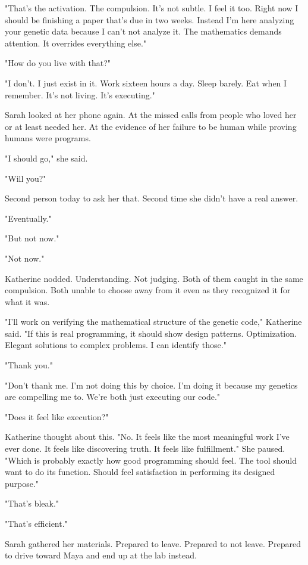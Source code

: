 "That's the activation. The compulsion. It's not subtle. I feel it too. Right now I should be finishing a paper that's due in two weeks. Instead I'm here analyzing your genetic data because I can't not analyze it. The mathematics demands attention. It overrides everything else."

"How do you live with that?"

"I don't. I just exist in it. Work sixteen hours a day. Sleep barely. Eat when I remember. It's not living. It's executing."

Sarah looked at her phone again. At the missed calls from people who loved her or at least needed her. At the evidence of her failure to be human while proving humans were programs.

"I should go," she said.

"Will you?"

Second person today to ask her that. Second time she didn't have a real answer.

"Eventually."

"But not now."

"Not now."

Katherine nodded. Understanding. Not judging. Both of them caught in the same compulsion. Both unable to choose away from it even as they recognized it for what it was.

"I'll work on verifying the mathematical structure of the genetic code," Katherine said. "If this is real programming, it should show design patterns. Optimization. Elegant solutions to complex problems. I can identify those."

"Thank you."

"Don't thank me. I'm not doing this by choice. I'm doing it because my genetics are compelling me to. We're both just executing our code."

"Does it feel like execution?"

Katherine thought about this. "No. It feels like the most meaningful work I've ever done. It feels like discovering truth. It feels like fulfillment." She paused. "Which is probably exactly how good programming should feel. The tool should want to do its function. Should feel satisfaction in performing its designed purpose."

"That's bleak."

"That's efficient."

Sarah gathered her materials. Prepared to leave. Prepared to not leave. Prepared to drive toward Maya and end up at the lab instead.

